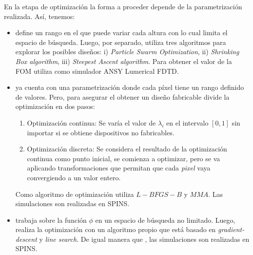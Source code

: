 En la etapa de optimización la forma a proceder depende de la parametrización realizada. Así, tenemos:

\begin{itemize}

  \item \cite{Prosopio-Galarza2019} define un rango en el que puede variar cada altura con lo cual limita el espacio de búsqueda.
    Luego, por separado, utiliza tres algoritmos para explorar los posibles diseños: i) \emph{Particle Swarm Optimization}, ii) \emph{Shrinking Box algorithm}, iii) \emph{Steepest Ascent algorithm}. 
    Para obtener el valor de la FOM utiliza como simulador ANSY Lumerical FDTD.

  \item \cite{Su2020} ya cuenta con una parametrización donde cada píxel tiene un rango definido de valores. 
  Pero, para asegurar el obtener un diseño fabricable divide la optimización en dos pasos:

  \begin{enumerate}
    \item Optimización continua: Se varía el valor de $\lambda_i$ en el intervalo $[0, 1]$ sin importar si se obtiene dispositivos no fabricables.

    \item Optimización discreta: Se considera el resultado de la optimización continua como punto inicial, se comienza a optimizar, pero se va aplicando transformaciones que permitan que cada \emph{pixel} vaya convergiendo a un valor entero.


  \end{enumerate}

  Como algoritmo de optimización utiliza $L-BFGS-B$ y $MMA$. Las simulaciones son realizadas en SPINS.

  \item \cite{Piggott2017} trabaja sobre la función $\phi$ en un espacio de búsqueda no limitado. 
    Luego, realiza la optimización con un algoritmo propio que está basado en \emph{gradient-descent} y \emph{line search}.
    De igual manera que \cite{Su2020}, las simulaciones son realizadas en SPINS.

\end{itemize}


